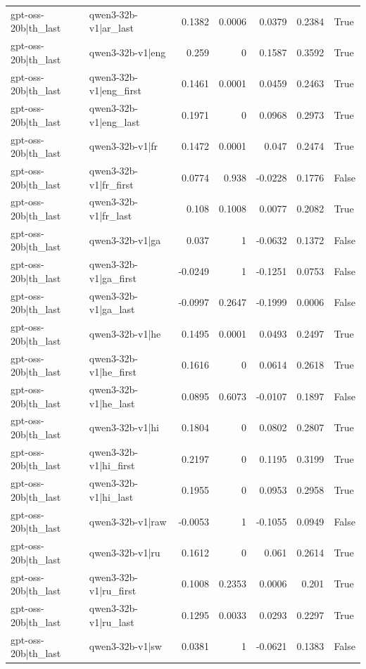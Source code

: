 \begin{table}
\begin{tabular}{l l r r r r l}
gpt-oss-20b|th_last & qwen3-32b-v1|ar_last & 0.1382 & 0.0006 & 0.0379 & 0.2384 & True \\
gpt-oss-20b|th_last & qwen3-32b-v1|eng & 0.259 & 0 & 0.1587 & 0.3592 & True \\
gpt-oss-20b|th_last & qwen3-32b-v1|eng_first & 0.1461 & 0.0001 & 0.0459 & 0.2463 & True \\
gpt-oss-20b|th_last & qwen3-32b-v1|eng_last & 0.1971 & 0 & 0.0968 & 0.2973 & True \\
gpt-oss-20b|th_last & qwen3-32b-v1|fr & 0.1472 & 0.0001 & 0.047 & 0.2474 & True \\
gpt-oss-20b|th_last & qwen3-32b-v1|fr_first & 0.0774 & 0.938 & -0.0228 & 0.1776 & False \\
gpt-oss-20b|th_last & qwen3-32b-v1|fr_last & 0.108 & 0.1008 & 0.0077 & 0.2082 & True \\
gpt-oss-20b|th_last & qwen3-32b-v1|ga & 0.037 & 1 & -0.0632 & 0.1372 & False \\
gpt-oss-20b|th_last & qwen3-32b-v1|ga_first & -0.0249 & 1 & -0.1251 & 0.0753 & False \\
gpt-oss-20b|th_last & qwen3-32b-v1|ga_last & -0.0997 & 0.2647 & -0.1999 & 0.0006 & False \\
gpt-oss-20b|th_last & qwen3-32b-v1|he & 0.1495 & 0.0001 & 0.0493 & 0.2497 & True \\
gpt-oss-20b|th_last & qwen3-32b-v1|he_first & 0.1616 & 0 & 0.0614 & 0.2618 & True \\
gpt-oss-20b|th_last & qwen3-32b-v1|he_last & 0.0895 & 0.6073 & -0.0107 & 0.1897 & False \\
gpt-oss-20b|th_last & qwen3-32b-v1|hi & 0.1804 & 0 & 0.0802 & 0.2807 & True \\
gpt-oss-20b|th_last & qwen3-32b-v1|hi_first & 0.2197 & 0 & 0.1195 & 0.3199 & True \\
gpt-oss-20b|th_last & qwen3-32b-v1|hi_last & 0.1955 & 0 & 0.0953 & 0.2958 & True \\
gpt-oss-20b|th_last & qwen3-32b-v1|raw & -0.0053 & 1 & -0.1055 & 0.0949 & False \\
gpt-oss-20b|th_last & qwen3-32b-v1|ru & 0.1612 & 0 & 0.061 & 0.2614 & True \\
gpt-oss-20b|th_last & qwen3-32b-v1|ru_first & 0.1008 & 0.2353 & 0.0006 & 0.201 & True \\
gpt-oss-20b|th_last & qwen3-32b-v1|ru_last & 0.1295 & 0.0033 & 0.0293 & 0.2297 & True \\
gpt-oss-20b|th_last & qwen3-32b-v1|sw & 0.0381 & 1 & -0.0621 & 0.1383 & False \\

\end{tabular}
\end{table}
